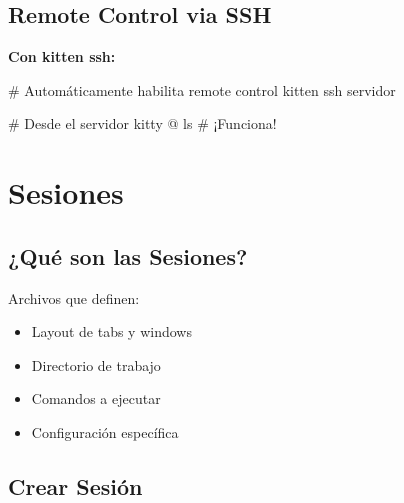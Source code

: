 \documentclass[
  doc,
  floatsintext,
  longtable,
  a4paper,
  nolmodern,
  notxfonts,
  notimes,
  12pt,
  colorlinks=true,linkcolor=blue,citecolor=blue,urlcolor=blue]{apa7}
\newenvironment{Shaded}{\begin{snugshade}}{\end{snugshade}}
\newcommand{\AttributeTok}[1]{\textcolor[rgb]{0.40,0.45,0.13}{#1}}
\newcommand{\BuiltInTok}[1]{\textcolor[rgb]{0.00,0.23,0.31}{#1}}
\newcommand{\CommentTok}[1]{\textcolor[rgb]{0.37,0.37,0.37}{#1}}
\newcommand{\ExtensionTok}[1]{\textcolor[rgb]{0.00,0.23,0.31}{#1}}
\newcommand{\NormalTok}[1]{\textcolor[rgb]{0.00,0.23,0.31}{#1}}
\newcommand{\OperatorTok}[1]{\textcolor[rgb]{0.37,0.37,0.37}{#1}}
\newcommand{\StringTok}[1]{\textcolor[rgb]{0.13,0.47,0.30}{#1}}
\newcommand{\VariableTok}[1]{\textcolor[rgb]{0.07,0.07,0.07}{#1}}
\providecommand{\tightlist}{%
  \setlength{\itemsep}{0pt}\setlength{\parskip}{0pt}}
\begin{document}
\subsection{Remote Control via SSH}\label{remote-control-via-ssh}

\begin{Shaded}
\end{Shaded}

\textbf{Con kitten ssh:}

\begin{Shaded}
\begin{Highlighting}[]
\CommentTok{\# Automáticamente habilita remote control}
\ExtensionTok{kitten}\NormalTok{ ssh servidor}

\CommentTok{\# Desde el servidor}
\ExtensionTok{kitty}\NormalTok{ @ ls  }\CommentTok{\# ¡Funciona!}
\end{Highlighting}
\end{Shaded}

\section{Sesiones}\label{sesiones}

\subsection{¿Qué son las Sesiones?}\label{quuxe9-son-las-sesiones}

Archivos que definen:

\begin{itemize}
\tightlist
\item
  Layout de tabs y windows
\item
  Directorio de trabajo
\item
  Comandos a ejecutar
\item
  Configuración específica
\end{itemize}

\subsection{Crear Sesión}\label{crear-sesiuxf3n}
\end{document}
